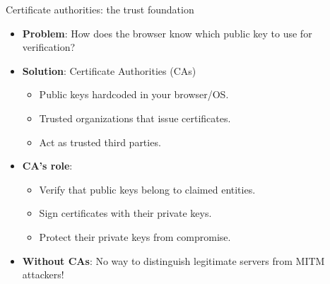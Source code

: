 \ifdefined\PRESENTATION\else\PassOptionsToClass{handout}{beamer}\fi\documentclass[aspectratio=169, lualatex]{beamer}
\begin{document}
\begin{frame}{Certificate authorities: the trust foundation}
	\begin{itemize}[<+->]
		\item \textbf{Problem}: How does the browser know which public key to use for verification?
		\item \textbf{Solution}: Certificate Authorities (CAs)
		      \begin{itemize}
			      \item Public keys hardcoded in your browser/OS.
			      \item Trusted organizations that issue certificates.
			      \item Act as trusted third parties.
		      \end{itemize}
		\item \textbf{CA's role}:
		      \begin{itemize}
			      \item Verify that public keys belong to claimed entities.
			      \item Sign certificates with their private keys.
			      \item Protect their private keys from compromise.
		      \end{itemize}
		\item \textbf{Without CAs}: No way to distinguish legitimate servers from MITM attackers!
	\end{itemize}
\end{frame}
\end{document}
